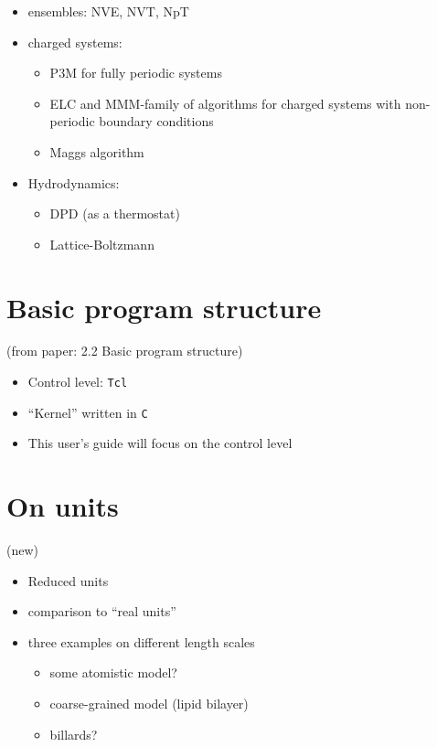 \begin{itemize}
\item ensembles: NVE, NVT, NpT
\item charged systems:
  \begin{itemize}
  \item P3M for fully periodic systems
  \item ELC and MMM-family of algorithms for charged systems with
    non-periodic boundary conditions
  \item Maggs algorithm 
  \end{itemize}
\item Hydrodynamics:
  \begin{itemize}
  \item DPD (as a thermostat)
  \item Lattice-Boltzmann
  \end{itemize}
\end{itemize}

\section{Basic program structure}
\label{sec:structure}

(from paper: 2.2 Basic program structure)

\begin{itemize}
\item Control level: \texttt{Tcl}
\item ``Kernel'' written in \texttt{C}
\item This user's guide will focus on the control level
\end{itemize}

\section{On units}
\label{sec:units}
(new)

\begin{itemize}
\item Reduced units
\item comparison to ``real units''
\item three examples on different length scales
  \begin{itemize}
  \item some atomistic model?
  \item coarse-grained model (\eg lipid bilayer)
  \item billards?
  \end{itemize}
\end{itemize}

